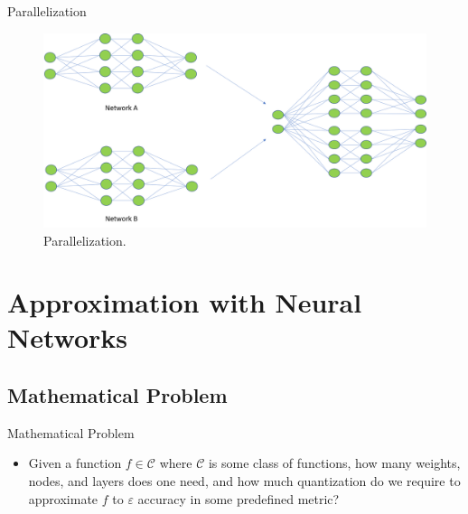 \documentclass{if-beamer}
\begin{document}
\begin{frame}{Parallelization}
    \begin{figure}[htbp]
        \includegraphics[width=1\textwidth]{parallelization.png}
        \caption{ Parallelization. }
        \label{fig:figure1}
    \end{figure}
\end{frame}

\section{Approximation with Neural Networks}

\subsection{Mathematical Problem}
\begin{frame}{Mathematical Problem}
\begin{itemize}
    \item Given a function $f \in \mathcal{C}$ where $\mathcal{C}$ is some class of functions, how many weights, nodes, and layers does one need, and how much quantization do we require to approximate $f$ to $\varepsilon$ accuracy in some predefined metric?
\end{itemize}
\end{frame}
\end{document}
